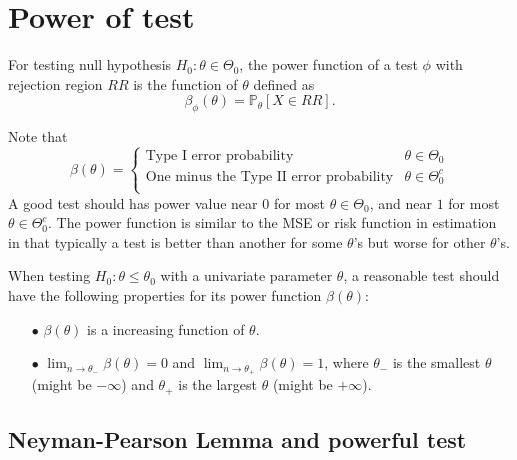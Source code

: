 \section{Power of test}

\begin{definition}
    For testing null hypothesis $H_0 : \theta \in \Theta_0$, the power function 
    of a test $\phi$ with rejection region $RR$ is the function of $\theta$ defined as 
    \begin{equation}
        \beta_\phi(\theta) = \mathbb{P}_\theta[X \in RR].
    \end{equation}
\end{definition}

Note that 
\[
    \beta(\theta) = \begin{cases}
        \text{Type I error probability} & \theta \in \Theta_0\\
        \text{One minus the Type II error probability} & \theta \in \Theta^c_0\\
    \end{cases}
\]
A good test should has power value near $0$ for most $\theta \in \Theta_0$, and near $1$ for most 
$\theta \in \Theta^c_0$. The power function is similar to the MSE or risk function in
 estimation in that typically a test is better than another for some $\theta$'s but worse for other 
 $\theta$'s.

 When testing $H_0 : \theta \leq \theta_0$ with a univariate parameter $\theta$, a reasonable test 
 should have the following properties for its power function $\beta(\theta)$:

 \begin{itemize}
    \item[$\bullet$] $\beta(\theta)$ is a increasing function of $\theta$.
    \item[$\bullet$] $\lim_{n \to \theta_-} \beta(\theta) = 0$ and $\lim_{n \to \theta_+} \beta(\theta) = 1$, where 
    $\theta_-$ is the smallest $\theta$ (might be $-\infty$) and $\theta_+$ is the largest $\theta$ (might be $+\infty$).
 \end{itemize}

\subsection{Neyman-Pearson Lemma and powerful test}

